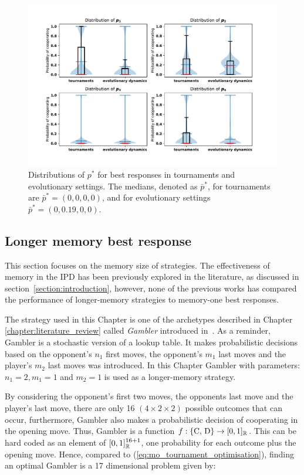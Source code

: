\begin{figure}[!htbp]
    \centering
    \includegraphics[width=.9\textwidth]{src/chapters/05/paper/memory-size-in-the-prisoners-dilemma/img/behaviour_violin_plots.pdf}
    \caption{Distributions of \(p^*\) for best responses in tournaments and
    evolutionary settings. The medians, denoted as \(\bar{p}^*\), for tournaments
    are \(\bar{p}^* = (0, 0, 0, 0)\), and for evolutionary settings
    \(\bar{p}^* = (0, 0.19, 0, 0)\).}
    \label{fig:behaviour_violin_plots}
\end{figure}

\subsection{Longer memory best response}\label{subsection:longer_memory_best_response}

This section focuses on the memory size of strategies. The effectiveness of
memory in the IPD has been previously explored in the literature, as
discussed in section~\ref{section:introduction}, however, none of the
previous works has compared the performance of longer-memory strategies to
memory-one best responses.

The strategy used in this Chapter is one of the archetypes described in Chapter
\ref{chapter:literature_review} called \textit{Gambler} introduced
in~\cite{Harper2017}. As a reminder, Gambler is a stochastic version of a lookup
table. It makes probabilistic decisions based on the opponent's \(n_1\) first
moves, the opponent's \(m_1\) last moves and the player's \(m_2\) last moves was
introduced. In this Chapter Gambler with parameters: $n_1 = 2, m_1 = 1$ and $m_2
= 1$ is used as a longer-memory strategy.

By considering the opponent's first two moves, the opponents last move and the
player's last move, there are only 16 $(4 \times 2 \times 2)$ possible outcomes
that can occur, furthermore, Gambler also makes a probabilistic decision of
cooperating in the opening move. Thus, Gambler is a function \(f: \{\text{C,
D}\} \rightarrow [0, 1]_{\mathbb{R}}\). This can be hard coded as an element
of \([0, 1]_{\mathbb{R}} ^ {16 + 1}\), one probability for each outcome plus the opening
move. Hence, compared to (\ref{eq:mo_tournament_optimisation}), finding an
optimal Gambler is a 17 dimensional problem given by:

